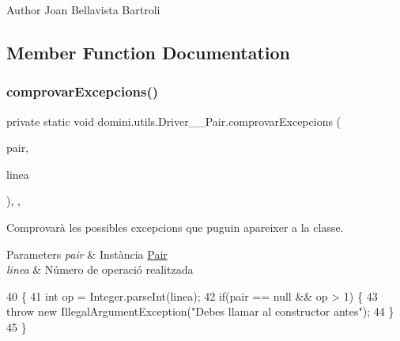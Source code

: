 \begin{DoxyAuthor}{Author}
Joan Bellavista Bartroli 
\end{DoxyAuthor}


\subsection{Member Function Documentation}
\mbox{\label{classdomini_1_1utils_1_1Driver____Pair_a640e07e7811e0b56a99ca1afb7e16b65}} 
\subsubsection{\texorpdfstring{comprovar\+Excepcions()}{comprovarExcepcions()}}
{\footnotesize\ttfamily private static void domini.\+utils.\+Driver\+\_\+\+\_\+\+Pair.\+comprovar\+Excepcions (\begin{DoxyParamCaption}\item[{\hyperlink{classdomini_1_1utils_1_1Pair}{Pair}$<$ Byte, Byte $>$}]{pair,  }\item[{String}]{linea }\end{DoxyParamCaption})\hspace{0.3cm}{\ttfamily [inline]}, {\ttfamily [static]}, {\ttfamily [private]}}



Comprovarà les possibles excepcions que puguin apareixer a la classe. 


\begin{DoxyParams}{Parameters}
{\em pair} & Instància \hyperlink{classdomini_1_1utils_1_1Pair}{Pair} \\
\hline
{\em linea} & Número de operació realitzada \\
\hline
\end{DoxyParams}

\begin{DoxyCode}
40                                                                                 \{
41         \textcolor{keywordtype}{int} op = Integer.parseInt(linea);
42         \textcolor{keywordflow}{if}(pair == null && op > 1) \{
43             \textcolor{keywordflow}{throw} \textcolor{keyword}{new} IllegalArgumentException(\textcolor{stringliteral}{"Debes llamar al constructor antes"});
44         \}
45     \}
\end{DoxyCode}
\mbox{\label{classdomini_1_1utils_1_1Driver____Pair_a6f6dda90b506c692dd03c4fc174550b7}} 
